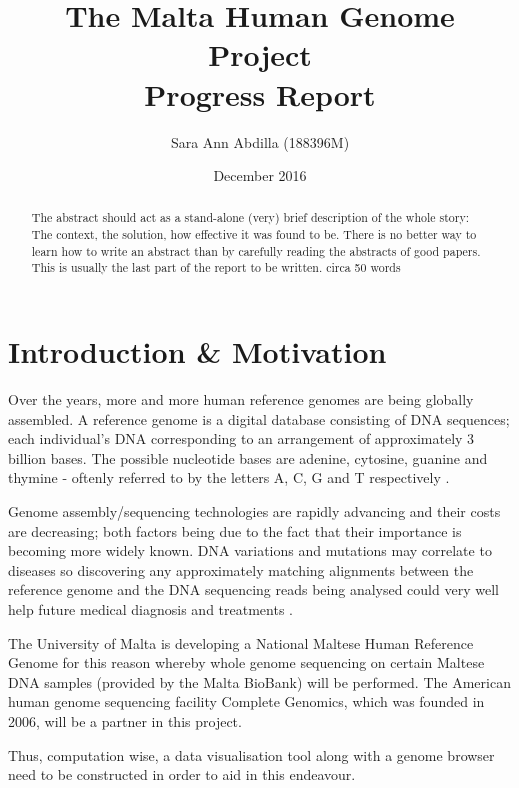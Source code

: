 \documentclass{csfyp}
\title{The Malta Human Genome Project \\
  \large Progress Report}
\author{Sara Ann Abdilla (188396M)}
\date{December 2016}
\begin{document}
\tableofcontents

\newpage

\setcounter{page}{1}


\begin{abstract}
The abstract should act as a stand-alone (very) brief description of the whole story: The context, the solution, how effective it was found to be. There is no better way to learn how to write an abstract than by carefully reading the abstracts of good papers. This is usually the last part of the report to be written. circa 50 words
\end{abstract}


\section{Introduction \& Motivation}
\label{s:intro}

Over the years, more and more human reference genomes are being globally assembled.  A reference genome is a digital database consisting of DNA sequences; each individual's DNA corresponding to an arrangement of approximately 3 billion bases.  The possible nucleotide bases are adenine, cytosine, guanine and thymine - oftenly referred to by the letters A, C, G and T respectively \cite{aiBk, introgenom}.  

Genome assembly/sequencing technologies are rapidly advancing and their costs are decreasing; both factors being due to the fact that their importance is becoming more widely known.  DNA variations and mutations may correlate to diseases so discovering any approximately matching alignments between the reference genome and the DNA sequencing reads being analysed could very well help future medical diagnosis and treatments \cite{think1, think2, think3}.

The University of Malta is developing a National Maltese Human Reference Genome for this reason whereby whole genome sequencing on certain Maltese DNA samples (provided by the Malta BioBank) will be performed.  The American human genome sequencing facility Complete Genomics, which was founded in 2006, will be a partner in this project. 

Thus, computation wise, a data visualisation tool along with a genome browser need to be constructed in order to aid in this endeavour.  
\end{document}
